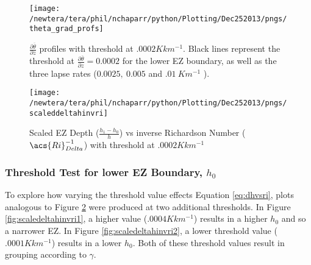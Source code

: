 \begin{figure}[htbp]
    \centering
    \texttt{[image: /newtera/tera/phil/nchaparr/python/Plotting/Dec252013/pngs/theta\_grad\_profs]}
    \caption[$\frac{\partial \overline{\theta}}{\partial z}$ Profiles with Threshold at $.0002Kkm^{-1}$]{$\frac{\partial \overline{\theta}}{\partial z}$ profiles with threshold at $.0002Kkm^{-1}$.  Black lines represent the threshold at $\frac{\partial \overline{\theta}}{\partial z} = 0.0002$ for the lower \acs{EZ} boundary, as well as the three lapse rates ($0.0025, \ 0.005$ and $.01 \ Km^{-1}$ ).}
    \label{fig:thresh}   %
\end{figure}

\begin{figure}[htbp]
\centering
 \texttt{[image: /newtera/tera/phil/nchaparr/python/Plotting/Dec252013/pngs/scaleddeltahinvri]}
       
        \caption{Scaled EZ Depth ($\frac{h_{1}-h_{0}}{h}$) vs inverse Richardson Number ($\acs{Ri}_{Delta}^{-1}$) with threshold at $.0002Kkm^{-1}$}
         \label{fig:scaledeltahinvri}
\end{figure}

\clearpage
\subsubsection{Threshold Test for lower \acs{EZ} Boundary, $h_{0}$}
To explore how varying the threshold value effects Equation \ref{eq:dhvsri}, plots analogous to Figure \ref{fig:scaledeltahinvri} were produced at two 
additional thresholds.  In Figure \ref{fig:scaledeltahinvri1}, a higher value ($.0004Kkm^{-1}$) results in a higher $h_{0}$   
and so a narrower \acs{EZ}.
In Figure \ref{fig:scaledeltahinvri2}, a lower threshold value ($.0001Kkm^{-1}$) results in a lower $h_{0}$.  Both of these threshold values result in grouping according to $\gamma$.\\

